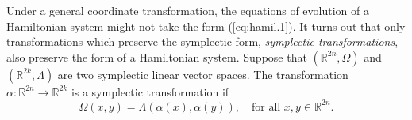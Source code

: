 Under a general coordinate transformation, the equations of evolution of a Hamiltonian system might not take the form (\ref{eq:hamil.1}). It turns out that only transformations which preserve the symplectic form, \emph{symplectic transformations}, also preserve the form of a Hamiltonian system. Suppose that $(\mathbb R^{2n},\Omega)$ and $(\mathbb R^{2k},\Lambda)$ are two symplectic linear vector spaces. The transformation $\alpha:\mathbb R^{2n}\to\mathbb R^{2k}$ is a symplectic transformation if
\begin{equation}
	\Omega(x,y) = \Lambda(\alpha(x),\alpha(y)), \quad \text{for all } x,y\in\mathbb R^{2n}.
\end{equation}

